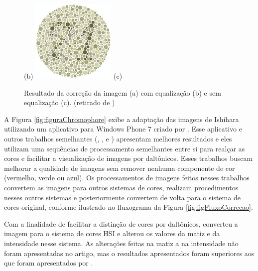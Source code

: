 \documentclass[	12pt, Times, openright, twoside, a4paper, english, brazil]{abntex2}
\begin{document}
\begin{figure}[!htb]
(b)
\endminipage\hfill
{}
\centering
{\includegraphics[width=\linewidth]{jleesemequalizacao.png}}
(c)
\endminipage\hfill
\caption{Resultado da correção da imagem (a) com equalização (b) e sem equalização (c). (retirado de )}
\label{fig:resultadosjlee}
\end{figure}


A Figura \ref{fig:figuraChromophore} exibe a adaptação das imagens de Ishihara utilizando um aplicativo para Windows Phone 7 criado por . Esse aplicativo e outros trabalhos semelhantes (, ,  e ) apresentam melhores resultados e eles utilizam uma sequências de processamento semelhantes entre si para realçar as cores e facilitar a visualização de imagens por daltônicos. Esses trabalhos buscam melhorar a qualidade de imagens sem remover nenhuma componente de cor (vermelho, verde ou azul). Os processamentos de imagens feitos nesses trabalhos convertem as imagens para outros sistemas de cores, realizam procedimentos nesses outros sistemas e posteriormente convertem de volta para o sistema de cores original, conforme ilustrado no fluxograma da Figura \ref{fig:figFluxoCorrecao}.

Com a finalidade de facilitar a distinção de cores por daltônicos,  converteu a imagem para o sistema de cores HSI e alterou os valores da matiz e da intensidade nesse sistema. As alterações feitas na matiz a na intensidade não foram apresentadas no artigo, mas o resultados apresentados foram superiores aos que foram apresentados por .
\end{document}
